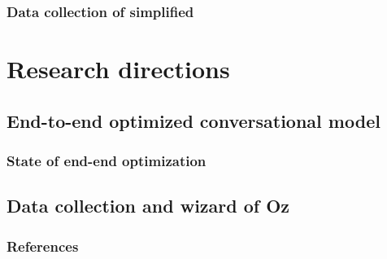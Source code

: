 \documentclass[10pt, compress,british,xcolor={svgnames,dvipsnames,x11names},trans]{beamer}
\begin{document}
\begin{frame}\frametitle{Data collection of simplified}
\end{frame}

\section{Research directions}  %

\subsection{End-to-end optimized conversational model}
\begin{frame}\frametitle{State of end-end optimization}
\end{frame}

\subsection{Data collection and wizard of Oz}




\appendix

\begin{frame}[allowframebreaks]
        \frametitle{References}
        
        
\end{frame}
\end{document}
